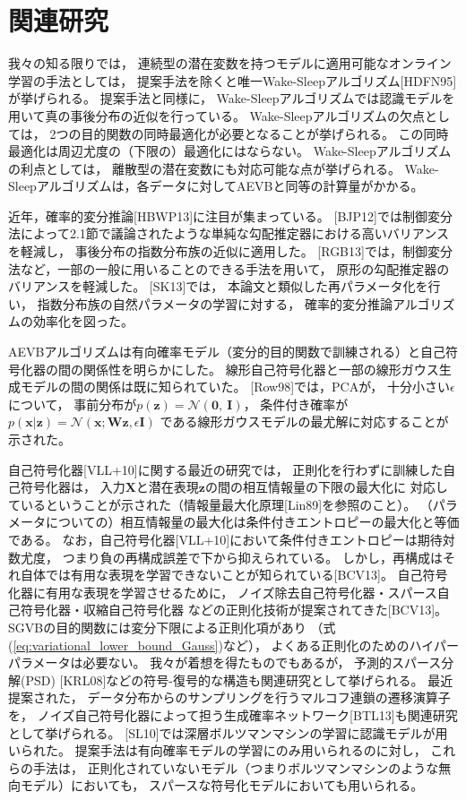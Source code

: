 \documentclass[dvipdfmx, fleqn, draft]{jsarticle}
\begin{document}
\section{関連研究}

我々の知る限りでは，
連続型の潜在変数を持つモデルに適用可能なオンライン学習の手法としては，
提案手法を除くと唯一Wake-Sleepアルゴリズム[HDFN95]が挙げられる。
提案手法と同様に，
Wake-Sleepアルゴリズムでは認識モデルを用いて真の事後分布の近似を行っている。
Wake-Sleepアルゴリズムの欠点としては，
2つの目的関数の同時最適化が必要となることが挙げられる。
この同時最適化は周辺尤度の（下限の）最適化にはならない。
Wake-Sleepアルゴリズムの利点としては，
離散型の潜在変数にも対応可能な点が挙げられる。
Wake-Sleepアルゴリズムは，各データに対してAEVBと同等の計算量がかかる。

近年，確率的変分推論[HBWP13]に注目が集まっている。
[BJP12]では制御変分法によって2.1節で議論されたような単純な勾配推定器における高いバリアンスを軽減し，
事後分布の指数分布族の近似に適用した。
[RGB13]では，制御変分法など，一部の一般に用いることのできる手法を用いて，
原形の勾配推定器のバリアンスを軽減した。
[SK13]では，
本論文と類似した再パラメータ化を行い，
指数分布族の自然パラメータの学習に対する，
確率的変分推論アルゴリズムの効率化を図った。

AEVBアルゴリズムは有向確率モデル（変分的目的関数で訓練される）と自己符号化器の間の関係性を明らかにした。
線形自己符号化器と一部の線形ガウス生成モデルの間の関係は既に知られていた。
[Row98]では，PCAが，
十分小さい\(\epsilon\)について，
事前分布が\(p(\bm{z}) = \mathcal{N}(\bm{0},\ \bm{I})\)，
条件付き確率が\(p(\bm{x} | \bm{z}) = \mathcal{N}(\bm{x}; \bm{Wz}, \epsilon \bm{I})\)
である線形ガウスモデルの最尤解に対応することが示された。

自己符号化器[VLL+10]に関する最近の研究では，
正則化を行わずに訓練した自己符号化器は，
入力\(\bm{X}\)と潜在表現\(\bm{z}\)の間の相互情報量の下限の最大化に
対応しているということが示された（情報量最大化原理[Lin89]を参照のこと）。
（パラメータについての）相互情報量の最大化は条件付きエントロピーの最大化と等価である。
なお，自己符号化器[VLL+10]において条件付きエントロピーは期待対数尤度，
つまり負の再構成誤差で下から抑えられている。
しかし，再構成はそれ自体では有用な表現を学習できないことが知られている[BCV13]。
自己符号化器に有用な表現を学習させるために，
ノイズ除去自己符号化器・スパース自己符号化器・収縮自己符号化器
などの正則化技術が提案されてきた[BCV13]。
SGVBの目的関数には変分下限による正則化項があり
（式(\ref{eq:variational_lower_bound_Gauss})など），
よくある正則化のためのハイパーパラメータは必要ない。
我々が着想を得たものでもあるが，
予測的スパース分解(PSD) [KRL08]などの符号-復号的な構造も関連研究として挙げられる。
最近提案された，
データ分布からのサンプリングを行うマルコフ連鎖の遷移演算子を，
ノイズ自己符号化器によって担う生成確率ネットワーク[BTL13]も関連研究として挙げられる。
[SL10]では深層ボルツマンマシンの学習に認識モデルが用いられた。
提案手法は有向確率モデルの学習にのみ用いられるのに対し，
これらの手法は，
正則化されていないモデル（つまりボルツマンマシンのような無向モデル）においても，
スパースな符号化モデルにおいても用いられる。
\end{document}
